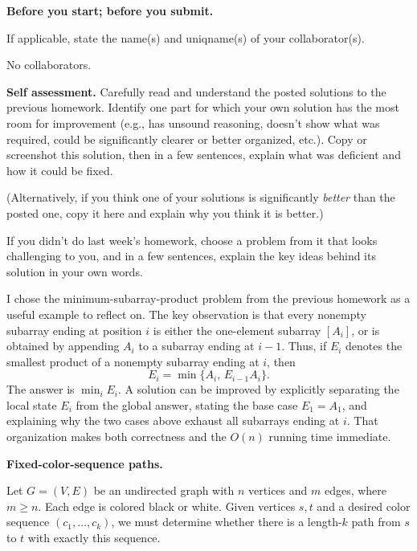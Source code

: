 \documentclass[11pt,addpoints,answers]{exam}
\begin{document}
\hwpreface

\begin{questions}

  \addtocounter{question}{-1}
  \question \textbf{Before you start; before you submit.}

  If applicable, state the name(s) and uniqname(s) of your collaborator(s).

  \begin{solution}
  No collaborators.
  \end{solution}

\question[10] \textbf{Self assessment.} \nopagebreak
  Carefully read and understand the posted solutions to the previous homework.
  Identify one part for which your own solution has the most room for improvement (e.g., has unsound reasoning, doesn’t show what was required, could be significantly clearer or better organized, etc.).
  Copy or screenshot this solution, then in a few sentences, explain what was deficient and how it could be fixed.

  (Alternatively, if you think one of your solutions is significantly \emph{better} than the posted one, copy it here and explain why you think it is better.)

  If you didn't do last week's homework, choose a problem from it that looks challenging to you, and in a few sentences, explain the key ideas behind its solution in your own words.

  \begin{solution}
  I chose the minimum-subarray-product problem from the previous homework as a
  useful example to reflect on.  The key observation is that every nonempty
  subarray ending at position $i$ is either the one-element subarray $[A_i]$,
  or is obtained by appending $A_i$ to a subarray ending at $i-1$.  Thus, if
  $E_i$ denotes the smallest product of a nonempty subarray ending at $i$,
  then
  \[
      E_i=\min\{A_i,\,E_{i-1}A_i\}.
  \]
  The answer is $\min_i E_i$.  A solution can be improved by explicitly
  separating the local state $E_i$ from the global answer, stating the base
  case $E_1=A_1$, and explaining why the two cases above exhaust all
  subarrays ending at $i$.  That organization makes both correctness and the
  $O(n)$ running time immediate.
  \end{solution}

\question \textbf{Fixed-color-sequence paths.}

Let $G=(V,E)$ be an undirected graph with $n$ vertices and $m$ edges, where
$m\ge n$.  Each edge is colored black or white.  Given vertices $s,t$ and a
desired color sequence $(c_1,\ldots,c_k)$, we must determine whether there is
a length-$k$ path from $s$ to $t$ with exactly this sequence.


\end{questions}
\end{document}
